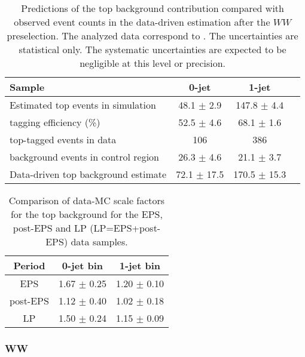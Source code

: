\begin{table}[!htbp]
\begin{center}
\begin{tabular}{l c c c}
\hline
Sample                                        &   0-jet          & 1-jet          \\
\hline
Estimated top events in simulation  	      &  48.1 $\pm$ 2.9  & 147.8 $\pm$ 4.4 \\
tagging efficiency (\%)                       &  52.5 $\pm$ 4.6  &  68.1 $\pm$ 1.6 \\
top-tagged events in data           	      &          106     &    386          \\
background events in control region           &  26.3 $\pm$ 4.6  &  21.1 $\pm$ 3.7 \\
Data-driven top background estimate           &  72.1 $\pm$ 17.5 & 170.5 $\pm$ 15.3\\
\hline
\end{tabular}
\caption{Predictions of the top background contribution compared 
with observed event counts in the data-driven estimation after the $WW$ preselection. 
The analyzed data correspond to \lpintlumi.
The uncertainties are statistical only. The systematic uncertainties are expected to be 
negligible at this level or precision.}
\label{tab:lp_ttbar_est}
\end{center}
\end{table}

\begin{table}[!htbp]
\begin{center}
\begin{tabular}{c c c} 
\hline
Period & 0-jet bin & 1-jet bin \\ 
\hline
EPS      & 1.67 $\pm$ 0.25 & 1.20 $\pm$ 0.10 \\
post-EPS & 1.12 $\pm$ 0.40 & 1.02 $\pm$ 0.18 \\
LP       & 1.50 $\pm$ 0.24 & 1.15 $\pm$ 0.09 \\
\hline
\end{tabular}
\caption{Comparison of data-MC scale factors for the top background for the EPS, post-EPS and LP (LP=EPS+post-EPS) data samples.}
\label{tab:lp_periods_top}
\end{center}
\end{table}

\subsubsection{WW}

